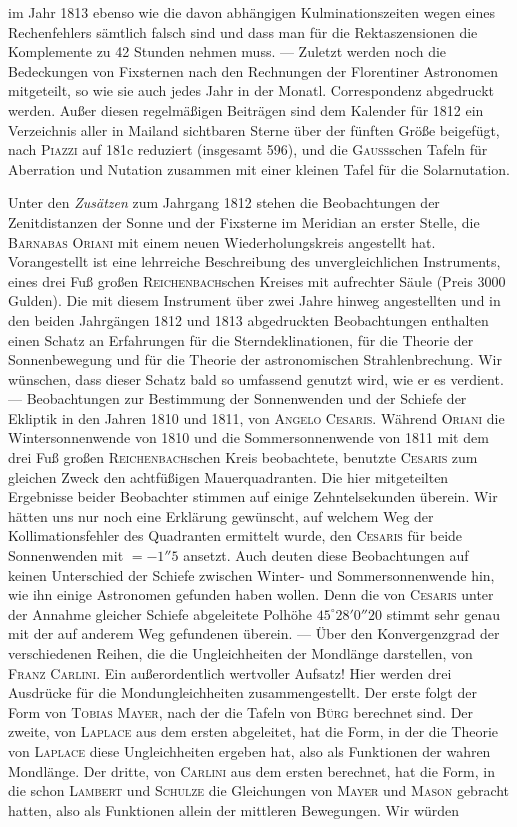 im Jahr 1813 ebenso wie die davon abhängigen Kulminationszeiten wegen eines Rechenfehlers sämtlich falsch sind und dass man für die Rektaszensionen die Komplemente zu 42 Stunden nehmen muss. --- Zuletzt werden noch die Bedeckungen von Fixsternen nach den Rechnungen der Florentiner Astronomen mitgeteilt, so wie sie auch jedes Jahr in der Monatl. Correspondenz abgedruckt werden. Außer diesen regelmäßigen Beiträgen sind dem Kalender für 1812 ein Verzeichnis aller in Mailand sichtbaren Sterne über der fünften Größe beigefügt, nach \textsc{Piazzi} auf 181c reduziert (insgesamt 596), und die \textsc{Gauß}schen Tafeln für Aberration und Nutation zusammen mit einer kleinen Tafel für die Solarnutation.

Unter den \emph{Zusätzen} zum Jahrgang 1812 stehen die Beobachtungen der Zenitdistanzen der Sonne und der Fixsterne im Meridian an erster Stelle, die \textsc{Barnabas Oriani} mit einem neuen Wiederholungskreis angestellt hat. Vorangestellt ist eine lehrreiche Beschreibung des unvergleichlichen Instruments, eines drei Fuß großen \textsc{Reichenbach}schen Kreises mit aufrechter Säule (Preis 3000 Gulden). Die mit diesem Instrument über zwei Jahre hinweg angestellten und in den beiden Jahrgängen 1812 und 1813 abgedruckten Beobachtungen enthalten einen Schatz an Erfahrungen für die Sterndeklinationen, für die Theorie der Sonnenbewegung und für die Theorie der astronomischen Strahlenbrechung. Wir wünschen, dass dieser Schatz bald so umfassend genutzt wird, wie er es verdient. --- Beobachtungen zur Bestimmung der Sonnenwenden und der Schiefe der Ekliptik in den Jahren 1810 und 1811, von \textsc{Angelo Cesaris}. Während \textsc{Oriani} die Wintersonnenwende von 1810 und die Sommersonnenwende von 1811 mit dem drei Fuß großen \textsc{Reichenbach}schen Kreis beobachtete, benutzte \textsc{Cesaris} zum gleichen Zweck den achtfüßigen Mauerquadranten. Die hier mitgeteilten Ergebnisse beider Beobachter stimmen auf einige Zehntelsekunden überein. Wir hätten uns nur noch eine Erklärung gewünscht, auf welchem Weg der Kollimationsfehler des Quadranten ermittelt wurde, den \textsc{Cesaris} für beide Sonnenwenden mit $= -1''5$ ansetzt. Auch deuten diese Beobachtungen auf keinen Unterschied der Schiefe zwischen Winter- und Sommersonnenwende hin, wie ihn einige Astronomen gefunden haben wollen. Denn die von \textsc{Cesaris} unter der Annahme gleicher Schiefe abgeleitete Polhöhe $45^\circ 28' 0''20$ stimmt sehr genau mit der auf anderem Weg gefundenen überein. --- Über den Konvergenzgrad der verschiedenen Reihen, die die Ungleichheiten der Mondlänge darstellen, von \textsc{Franz Carlini}. Ein außerordentlich wertvoller Aufsatz! Hier werden drei Ausdrücke für die Mondungleichheiten zusammengestellt. Der erste folgt der Form von \textsc{Tobias Mayer}, nach der die Tafeln von \textsc{Bürg} berechnet sind. Der zweite, von \textsc{Laplace} aus dem ersten abgeleitet, hat die Form, in der die Theorie von \textsc{Laplace} diese Ungleichheiten ergeben hat, also als Funktionen der wahren Mondlänge. Der dritte, von \textsc{Carlini} aus dem ersten berechnet, hat die Form, in die schon \textsc{Lambert} und \textsc{Schulze} die Gleichungen von \textsc{Mayer} und \textsc{Mason} gebracht hatten, also als Funktionen allein der mittleren Bewegungen. Wir würden 